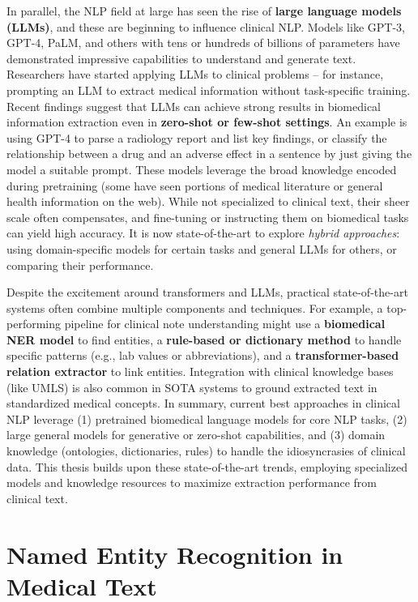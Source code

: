 In parallel, the NLP field at large has seen the rise of \textbf{large language models (LLMs)}, and these are beginning to influence clinical NLP. Models like GPT-3, GPT-4, PaLM, and others with tens or hundreds of billions of parameters have demonstrated impressive capabilities to understand and generate text. Researchers have started applying LLMs to clinical problems – for instance, prompting an LLM to extract medical information without task-specific training. Recent findings suggest that LLMs can achieve strong results in biomedical information extraction even in \textbf{zero-shot or few-shot settings}. An example is using GPT-4 to parse a radiology report and list key findings, or classify the relationship between a drug and an adverse effect in a sentence by just giving the model a suitable prompt. These models leverage the broad knowledge encoded during pretraining (some have seen portions of medical literature or general health information on the web). While not specialized to clinical text, their sheer scale often compensates, and fine-tuning or instructing them on biomedical tasks can yield high accuracy. It is now state-of-the-art to explore \emph{hybrid approaches}: using domain-specific models for certain tasks and general LLMs for others, or comparing their performance.

Despite the excitement around transformers and LLMs, practical state-of-the-art systems often combine multiple components and techniques. For example, a top-performing pipeline for clinical note understanding might use a \textbf{biomedical NER model} to find entities, a \textbf{rule-based or dictionary method} to handle specific patterns (e.g., lab values or abbreviations), and a \textbf{transformer-based relation extractor} to link entities. Integration with clinical knowledge bases (like UMLS) is also common in SOTA systems to ground extracted text in standardized medical concepts. In summary, current best approaches in clinical NLP leverage (1) pretrained biomedical language models for core NLP tasks, (2) large general models for generative or zero-shot capabilities, and (3) domain knowledge (ontologies, dictionaries, rules) to handle the idiosyncrasies of clinical data. This thesis builds upon these state-of-the-art trends, employing specialized models and knowledge resources to maximize extraction performance from clinical text.

\section{Named Entity Recognition in Medical Text}


